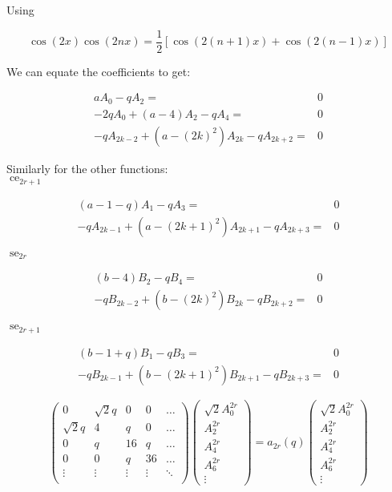 \documentclass{article}
\DeclareMathOperator{\ce}{ce}
\DeclareMathOperator{\se}{se}
\begin{document}
Using 

\begin{equation}
    \cos(2x) \cos(2nx) = \frac{1}{2} \left[\cos(2(n+1)x) + \cos(2(n-1)x)\right]
\end{equation}

We can equate the coefficients to get:

\begin{align}
    a A_0 - q A_2= & 0 \\
    -2qA_0 + (a - 4) A_2 - q A_4 = & 0 \\
    -qA_{2k-2} + (a - (2k)^2) A_{2k} - q A_{2k+2} = & 0
\end{align}

Similarly for the other functions: \\
$\ce_{2r+1}$

\begin{align}
    (a - 1 - q) A_1 - q A_3 = & 0 \\
    -qA_{2k-1} + (a - (2k+1)^2) A_{2k+1} - q A_{2k+3} = & 0
\end{align}

$\se_{2r}$

\begin{align}
    (b - 4) B_2 - q B_4 = & 0 \\
    -qB_{2k-2} + (b - (2k)^2) B_{2k} - q B_{2k+2} = & 0
\end{align}

$\se_{2r+1}$

\begin{align}
    (b - 1 + q) B_1 - q B_3 = & 0 \\
    -qB_{2k-1} + (b - (2k+1)^2) B_{2k+1} - q B_{2k+3} = & 0
\end{align}

\begin{equation}
    \left(
    \begin{matrix}
        0 & \sqrt{2}q & 0 & 0 & \dots \\
        \sqrt{2}q & 4 & q & 0 & \dots \\
        0 & q & 16 & q & \dots \\
        0 & 0 & q & 36 & \dots \\
        \vdots & \vdots & \vdots & \vdots & \ddots \\

    \end{matrix}
    \right)
    \left(
    \begin{matrix}
        \sqrt{2}A_0^{2r} \\
        A_2^{2r}\\
        A_4^{2r}\\
        A_6^{2r}\\
        \vdots
    \end{matrix}
    \right)
    = a_{2r}(q)
    \left(
    \begin{matrix}
        \sqrt{2}A_0^{2r} \\
        A_2^{2r}\\
        A_4^{2r}\\
        A_6^{2r}\\
        \vdots
    \end{matrix}
    \right)
\end{equation}
\end{document}
